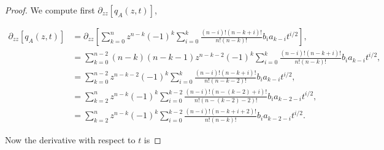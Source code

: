 \begin{proof}
        



        We compute first $\partial_{zz} [q_A(z,t)]$,

        \begin{align*}
            \partial_{zz} [q_A(z,t)] %
            &= \partial_{zz} \left[ \sum_{k=0}^n z^{n-k}(-1)^k \sum_{i=0}^k \frac{(n-i)!(n-k+i)!}{n!(n-k)!} b_i a_{k-i} t^{i/2} \right],\\
            &= \sum_{k=0}^{n-2} (n-k)(n-k-1)z^{n-k-2}(-1)^k \sum_{i=0}^k \frac{(n-i)!(n-k+i)!}{n!(n-k)!} b_i a_{k-i} t^{i/2}, \\
            &= \sum_{k=0}^{n-2} z^{n-k-2}(-1)^k \sum_{i=0}^k \frac{(n-i)!(n-k+i)!}{n!(n-k-2)!} b_i a_{k-i} t^{i/2}, \\
            &= \sum_{k=2}^{n} z^{n-k}(-1)^k \sum_{i=0}^{k-2} \frac{(n-i)!(n-(k-2)+i)!}{n!(n-(k-2)-2)!} b_i a_{k-2-i}t^{i/2},\\ 
            &= \sum_{k=2}^{n} z^{n-k}(-1)^k \sum_{i=0}^{k-2} \frac{(n-i)!(n-k+i+2)!}{n!(n-k)!} b_i a_{k-2-i}t^{i/2}.
        \end{align*}

        Now the derivative with respect to $t$ is


\end{proof}
